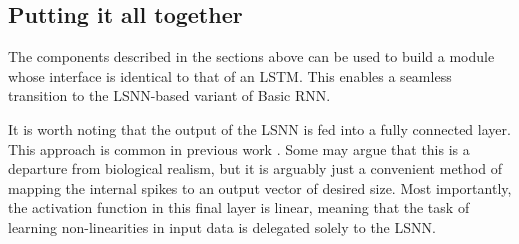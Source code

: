 \documentclass[../../report.tex]{subfiles}
\begin{document}
\subsection{Putting it all together}

The components described in the sections above can be used to build a module
whose interface is identical to that of an LSTM. This enables a seamless
transition to the LSNN-based variant of Basic RNN.

It is worth noting that the output of the LSNN is fed into a fully connected
layer. This approach is common in previous work \cite{Bellec2018LSNN,
Bellec2020}. Some may argue that this is a departure from biological realism,
but it is arguably just a convenient method of mapping the internal spikes to an
output vector of desired size. Most importantly, the activation function in this
final layer is linear, meaning that the task of learning non-linearities in
input data is delegated solely to the LSNN.

\end{document}
